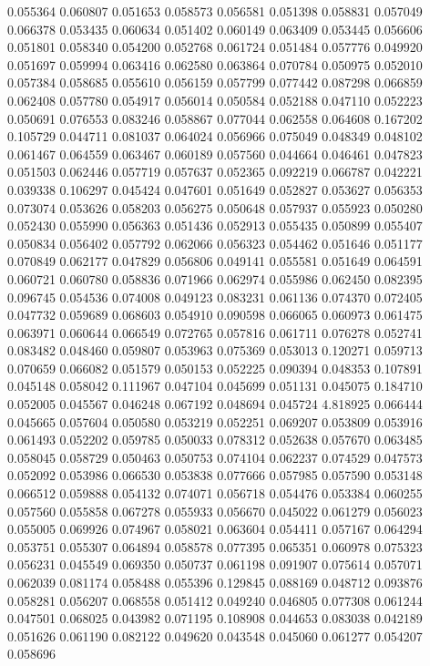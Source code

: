 0.055364
0.060807
0.051653
0.058573
0.056581
0.051398
0.058831
0.057049
0.066378
0.053435
0.060634
0.051402
0.060149
0.063409
0.053445
0.056606
0.051801
0.058340
0.054200
0.052768
0.061724
0.051484
0.057776
0.049920
0.051697
0.059994
0.063416
0.062580
0.063864
0.070784
0.050975
0.052010
0.057384
0.058685
0.055610
0.056159
0.057799
0.077442
0.087298
0.066859
0.062408
0.057780
0.054917
0.056014
0.050584
0.052188
0.047110
0.052223
0.050691
0.076553
0.083246
0.058867
0.077044
0.062558
0.064608
0.167202
0.105729
0.044711
0.081037
0.064024
0.056966
0.075049
0.048349
0.048102
0.061467
0.064559
0.063467
0.060189
0.057560
0.044664
0.046461
0.047823
0.051503
0.062446
0.057719
0.057637
0.052365
0.092219
0.066787
0.042221
0.039338
0.106297
0.045424
0.047601
0.051649
0.052827
0.053627
0.056353
0.073074
0.053626
0.058203
0.056275
0.050648
0.057937
0.055923
0.050280
0.052430
0.055990
0.056363
0.051436
0.052913
0.055435
0.050899
0.055407
0.050834
0.056402
0.057792
0.062066
0.056323
0.054462
0.051646
0.051177
0.070849
0.062177
0.047829
0.056806
0.049141
0.055581
0.051649
0.064591
0.060721
0.060780
0.058836
0.071966
0.062974
0.055986
0.062450
0.082395
0.096745
0.054536
0.074008
0.049123
0.083231
0.061136
0.074370
0.072405
0.047732
0.059689
0.068603
0.054910
0.090598
0.066065
0.060973
0.061475
0.063971
0.060644
0.066549
0.072765
0.057816
0.061711
0.076278
0.052741
0.083482
0.048460
0.059807
0.053963
0.075369
0.053013
0.120271
0.059713
0.070659
0.066082
0.051579
0.050153
0.052225
0.090394
0.048353
0.107891
0.045148
0.058042
0.111967
0.047104
0.045699
0.051131
0.045075
0.184710
0.052005
0.045567
0.046248
0.067192
0.048694
0.045724
4.818925
0.066444
0.045665
0.057604
0.050580
0.053219
0.052251
0.069207
0.053809
0.053916
0.061493
0.052202
0.059785
0.050033
0.078312
0.052638
0.057670
0.063485
0.058045
0.058729
0.050463
0.050753
0.074104
0.062237
0.074529
0.047573
0.052092
0.053986
0.066530
0.053838
0.077666
0.057985
0.057590
0.053148
0.066512
0.059888
0.054132
0.074071
0.056718
0.054476
0.053384
0.060255
0.057560
0.055858
0.067278
0.055933
0.056670
0.045022
0.061279
0.056023
0.055005
0.069926
0.074967
0.058021
0.063604
0.054411
0.057167
0.064294
0.053751
0.055307
0.064894
0.058578
0.077395
0.065351
0.060978
0.075323
0.056231
0.045549
0.069350
0.050737
0.061198
0.091907
0.075614
0.057071
0.062039
0.081174
0.058488
0.055396
0.129845
0.088169
0.048712
0.093876
0.058281
0.056207
0.068558
0.051412
0.049240
0.046805
0.077308
0.061244
0.047501
0.068025
0.043982
0.071195
0.108908
0.044653
0.083038
0.042189
0.051626
0.061190
0.082122
0.049620
0.043548
0.045060
0.061277
0.054207
0.058696
